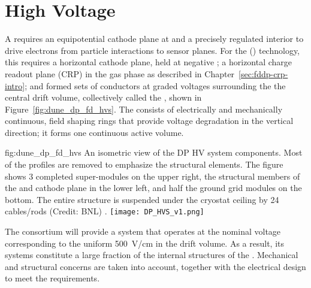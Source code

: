 \chapter{High Voltage}
\label{ch:dp-hv}

\label{sec:fddp-hv-ov}

\label{sec:fddp-hv-intro}

A  requires an equipotential cathode plane at  and a precisely regulated interior \efield to drive 
electrons from particle interactions to sensor planes.  For the   () technology, 
this requires a horizontal cathode plane, held at negative ; a horizontal charge readout plane (CRP) in the gas phase as described in Chapter~\ref{sec:fddp-crp-intro}; and formed sets of conductors at graded voltages surrounding the
 the central drift volume, collectively called the , shown in Figure~\ref{fig:dune_dp_fd_hvs}. The  consists of electrically and mechanically continuous, field shaping rings that provide voltage degradation in the vertical direction; it forms one continuous active volume.


\begin{dunefigure}{fig:dune_dp_fd_hvs}
{An isometric view of the DP HV system components. Most of the  profiles are removed to emphasize the structural elements.  The figure shows 3 completed  super-modules on the upper right, the structural members of the  and cathode plane in the lower left, and half the ground grid modules on the bottom.  The entire structure is suspended under the cryostat ceiling by 24 cables/rods (Credit: BNL) }.
\texttt{[image: DP\_HVS\_v1.png]}
\end{dunefigure}

The  consortium will provide a system that operates at the nominal voltage corresponding to the uniform \SI{500}{V/cm} \efield in the  drift volume. As a result, its systems %
constitute a large fraction of the %
internal structures of the . %
Mechanical and structural concerns are taken into account, together with the electrical design to meet the requirements. 

